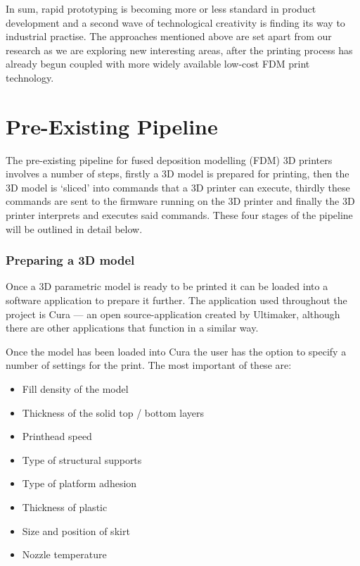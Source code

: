 \documentclass[11pt]{report} %
\begin{document}
In sum, rapid prototyping is becoming more or less standard in product development and a second wave of technological creativity is finding its way to industrial practise. The approaches mentioned above are set apart from our research as we are exploring new interesting areas, after the printing process has already begun coupled with more widely available low-cost FDM print technology. 




\section{Pre-Existing Pipeline}
\label{section:PreExistingPipeline}
The pre-existing pipeline for fused deposition modelling (FDM) 3D printers involves a number of steps, firstly a 3D model is prepared for printing, then the 3D model is `sliced' into commands that a 3D printer can execute, thirdly these commands are sent to the firmware running on the 3D printer and finally the 3D printer interprets and executes said commands. These four stages of the pipeline will be outlined in detail below. 

\subsubsection{Preparing a 3D model}
Once a 3D parametric model is ready to be printed it can be loaded into a software application to prepare it further. The application used throughout the project is Cura --- an open source-application created by Ultimaker, although there are other applications that function in a similar way.

Once the model has been loaded into Cura the user has the option to specify a number of settings for the print. The most important of these are:

\begin{itemize}
\item Fill density of the model
\item Thickness of the solid top / bottom layers
\item Printhead speed
\item Type of structural supports
\item Type of platform adhesion
\item Thickness of plastic
\item Size and position of skirt
\item Nozzle temperature
\end{itemize}
\end{document}
